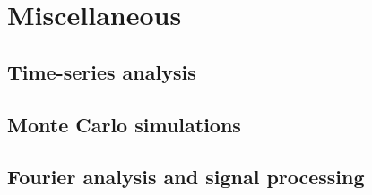 \chapter{Miscellaneous}
\section{Time-series analysis}
\section{Monte Carlo simulations}
\section{Fourier analysis and signal processing}